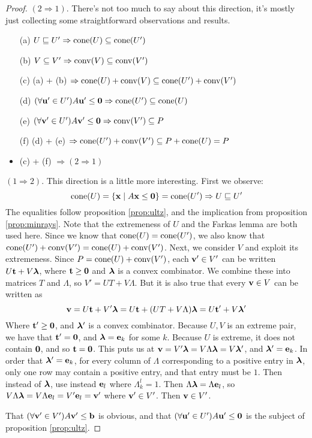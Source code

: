 \begin{proof}
$(2 \Rightarrow 1)$.  There's not too much to say about this direction, it's mostly just collecting some straightforward observations and results.
\begin{itemize}
  \item[(a)] $U \sqsubseteq U' \Rightarrow \operatorname{cone}(U) \subseteq \operatorname{cone}(U')$  
  \item[(b)] $V \subseteq V' \Rightarrow \operatorname{conv}(V) \subseteq \operatorname{conv}(V')$
  \item[(c)] (a) + (b) $\Rightarrow \operatorname{cone}(U)+\operatorname{conv}(V) \subseteq \operatorname{cone}(U') + \operatorname{conv}(V')$
  \item[(d)] $(\forall \mathbf{u}'\in U') A\mathbf{u}' \leq \mathbf{0} \Rightarrow \operatorname{cone}(U') \subseteq \operatorname{cone}(U)$
  \item[(e)] $(\forall \mathbf{v}'\in U') A\mathbf{v}' \leq \mathbf{0} \Rightarrow \operatorname{conv}(V') \subseteq P$
  \item[(f)] (d) + (e) $\Rightarrow \operatorname{cone}(U') + \operatorname{conv}(V') \subseteq P + \operatorname{cone}(U) = P$
  \item (c) + (f) $\Rightarrow (2 \Rightarrow 1)$
\end{itemize}

$(1 \Rightarrow 2)$.  This direction is a little more interesting.  First we observe:
\[ \operatorname{cone}(U) = \left\{\mathbf{x}\;|\; A\mathbf{x}\leq\mathbf{0}\right\} = \operatorname{cone}(U') \Rightarrow U \sqsubseteq U' \]
The equalities follow proposition \ref{prop:ultz}, and the implication from proposition \ref{prop:minrays}.  Note that the extremeness of $U$ and the Farkas lemma are both used here.  Since we know that $\operatorname{cone}(U) = \operatorname{cone}(U')$, we also know that $\operatorname{cone}(U') + \operatorname{conv}(V') = \operatorname{cone}(U) + \operatorname{conv}(V')$.  Next, we consider $V$ and exploit its extremeness.  Since $P = \operatorname{cone}(U) + \operatorname{conv}(V')$, each $\mathbf{v}'\in V'$ can be written $U\mathbf{t} + V\bm{\lambda}$, where $\mathbf{t} \geq \mathbf{0}$ and $\bm{\lambda}$ is a convex combinator.  We combine these into matrices $T$ and $\Lambda$, so $V' = UT + V\Lambda$.  But it is also true that every $\mathbf{v}\in V$ can be written as 
  \[ \mathbf{v} = U\mathbf{t} + V'\bm{\lambda} = U\mathbf{t} + (UT + V\Lambda)\bm{\lambda} = U\mathbf{t}' + V\bm{\lambda}' \]
Where $\mathbf{t}'\geq\mathbf{0}$, and $\bm{\lambda}'$ is a convex combinator.  Because $U,V$ is an extreme pair, we have that $\mathbf{t}'=\mathbf{0}$, and $\bm{\lambda} = \mathbf{e}_k$ for some $k$.  Because $U$ is extreme, it does not contain $\mathbf{0}$, and so $\mathbf{t} = \mathbf{0}$.  This puts us at $\mathbf{v} = V'\bm{\lambda} = V\Lambda\bm{\lambda} = V\bm{\lambda}'$, and $\bm{\lambda}' = \mathbf{e}_k$.  In order that $\bm{\lambda}' = \mathbf{e}_k$, for every column of $\Lambda$ corresponding to a positive entry in $\bm{\lambda}$, only one row may contain a positive entry, and that entry must be $1$.  Then instead of $\bm{\lambda}$, use instead $\mathbf{e}_l$ where $\Lambda_k^l = 1$.  Then $\Lambda\bm{\lambda} = \Lambda\mathbf{e}_l$, so $V\Lambda\bm{\lambda} = V\Lambda\mathbf{e}_l = V'\mathbf{e}_l=\mathbf{v}'$ where $\mathbf{v}'\in V'$.  Then $\mathbf{v} \in V'$.

That $(\forall \mathbf{v}'\in V')A\mathbf{v}'\leq\mathbf{b}$ is obvious, and that $(\forall\mathbf{u}'\in U') A\mathbf{u}'\leq\mathbf{0}$ is the subject of proposition \ref{prop:ultz}.
\end{proof}

